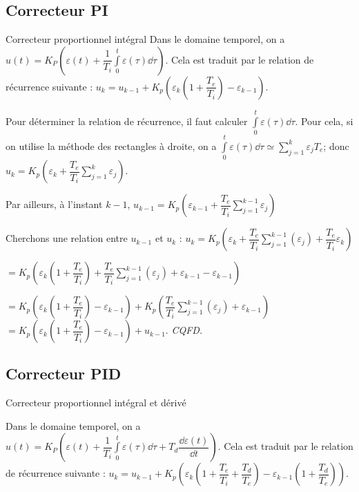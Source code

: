 \subsection{Correcteur PI}
\begin{defi}{Correcteur proportionnel intégral}
Dans le domaine temporel, on a $u(t)=K_P  \left(\varepsilon(t)+\dfrac{1}{T_i}\int\limits_0^t \varepsilon(\tau) \dd \tau \right)$. Cela est traduit par le relation de récurrence suivante : 
$u_k = u_{k-1} +  K_p \left( \varepsilon_k \left( 1+\dfrac{T_e}{T_i}\right) - \varepsilon_{k-1} \right)$.
\end{defi}

\begin{demo}
Pour déterminer la relation de récurrence, il faut calculer $\int\limits_0^t \varepsilon(\tau) \dd \tau$. 
Pour cela, si on utilise la méthode des rectangles à droite, on a 
$\int\limits_0^t \varepsilon(\tau) \dd \tau \simeq \sum\limits_{j=1}^k \varepsilon_j T_e$; donc 
$u_k = K_p\left(\varepsilon_k + \dfrac{T_e}{T_i}\sum\limits_{j=1}^k \varepsilon_j \right)$.

Par ailleurs, à l'instant $k-1$, $u_{k-1} = K_p\left(\varepsilon_{k-1} + \dfrac{T_e}{T_i}\sum\limits_{j=1}^{k-1} \varepsilon_j \right)$


Cherchons une relation entre $u_{k-1}$ et $u_{k}$ : 
$u_k = K_p\left(\varepsilon_k + \dfrac{T_e}{T_i}\sum\limits_{j=1}^{k-1} \left(\varepsilon_j \right) + \dfrac{T_e}{T_i} \varepsilon_k \right)$

$= K_p\left(\varepsilon_k \left(1+\dfrac{T_e}{T_i}\right)+ \dfrac{T_e}{T_i}\sum\limits_{j=1}^{k-1} \left(\varepsilon_j \right) + \varepsilon_{k-1} - \varepsilon_{k-1}\right)$

$= K_p\left(\varepsilon_k \left(1+\dfrac{T_e}{T_i}\right) - \varepsilon_{k-1}\right)
+ K_p\left(\dfrac{T_e}{T_i}\sum\limits_{j=1}^{k-1} \left(\varepsilon_j \right) + \varepsilon_{k-1} \right) $
$= K_p\left(\varepsilon_k \left(1+\dfrac{T_e}{T_i}\right) - \varepsilon_{k-1}\right) + u_{k-1} $. \textit{CQFD.}
\end{demo}


\subsection{Correcteur PID}
\begin{defi}{Correcteur proportionnel intégral et dérivé}

Dans le domaine temporel, on a $u(t)=K_P  \left(\varepsilon(t)+\dfrac{1}{T_i}\int\limits_0^t \varepsilon(\tau) \dd \tau +T_d \dfrac{\dd \varepsilon(t)}{\dd t}\right)$. Cela est traduit par le relation de récurrence suivante : 
$u_k = u_{k-1} + K_p \left( \varepsilon_k \left( 1+\dfrac{T_e}{T_i}+\dfrac{T_d}{T_e}\right) - \varepsilon_{k-1} \left( 1+\dfrac{T_d}{T_e}\right)\right)$.

\end{defi}

